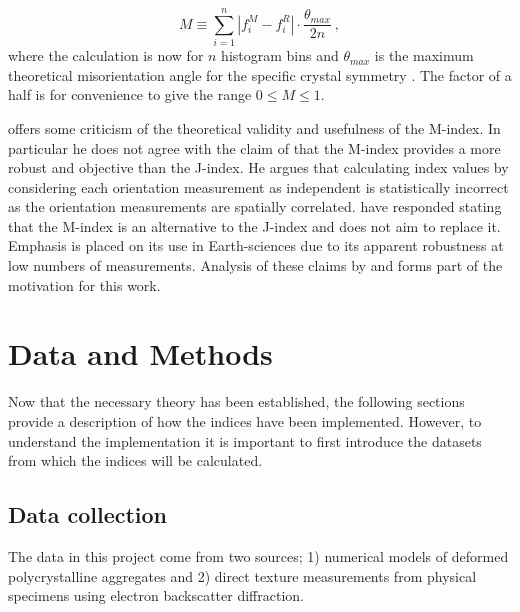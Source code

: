 \documentclass[a4paper,12pt]{report}
\numberwithin{equation}{chapter}
\begin{document}
\begin{equation} \label{eq:Mindex_disc}
M \equiv \sum_{i=1}^n | f_i^M - f_i^R | \cdot \frac{\theta_{max}}{2n}\ ,
\end{equation} 
where the calculation is now for $n$ histogram bins and $\theta_{max}$ is the maximum theoretical misorientation angle for the specific crystal symmetry \citep[for discussion on misorientation angle distirbutions for various crystal symmetries see][and references therein]{Grimmer1979,Wheeler2001}. The factor of a half is for convenience to give the range $0 \leq M \leq 1$. 

  

\cite{Schaeben2007} offers some criticism of the theoretical validity and usefulness of the M-index. In particular he does not agree with the claim of \cite{Skemer} that the M-index provides a more robust and objective than the J-index. He argues that calculating index values by considering each orientation measurement as independent is statistically incorrect as the orientation measurements are spatially correlated. \cite{Skemer2007reply} have responded stating that the M-index is an alternative to the J-index and does not aim to replace it. Emphasis is placed on its use in Earth-sciences due to its apparent robustness at low numbers of measurements. Analysis of these claims by \cite{Skemer} and \cite{Skemer2007reply} forms part of the motivation for this work.  

\chapter{Data and Methods} \label{chap:methods}
\vspace{-1cm}

Now that the necessary theory has been established, the following sections provide a description of how the indices have been implemented. However, to understand the implementation it is important to first introduce the datasets from which the indices will be calculated.  

\section{Data collection} \label{sec:data}
The data in this project come from two sources; 1) numerical models of deformed polycrystalline aggregates and 2) direct texture measurements from physical specimens using electron backscatter diffraction. 
\end{document}
